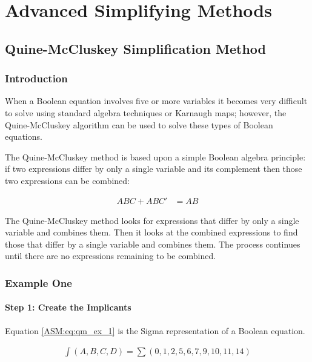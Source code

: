 \chapter{Advanced Simplifying Methods}\label{ch07}
\section{Quine-McCluskey Simplification Method}
\subsection{Introduction}

 When a Boolean equation involves five or more variables it becomes very difficult to solve using standard algebra techniques or Karnaugh maps; however, the Quine-McCluskey algorithm can be used to solve these types of Boolean equations.  

The Quine-McCluskey method is based upon a simple Boolean algebra principle: if two expressions differ by only a single variable and its complement then those two expressions can be combined: 

\begin{align}
	\label{ASM:eq:quine-mccluskey_combining_complements}
	ABC+ABC' &= AB 
\end{align}

The Quine-McCluskey method looks for expressions that differ by only a single variable and combines them. Then it looks at the combined expressions to find those that differ by a single variable and combines them. The process continues until there are no expressions remaining to be combined.

\subsection{Example One}
\label{ASM:subsec:quine-mccluskey_ex_1}

\subsubsection{Step 1: Create the Implicants}
\label{ASM:subsubsec:quine-mccluskey_ex_1_step_1}

Equation \ref{ASM:eq:qm_ex_1} is the Sigma representation of a Boolean equation.

\begin{align}
	\label{ASM:eq:qm_ex_1}
	\int(A,B,C,D)=\sum(0,1,2,5,6,7,9,10,11,14) 
\end{align}

